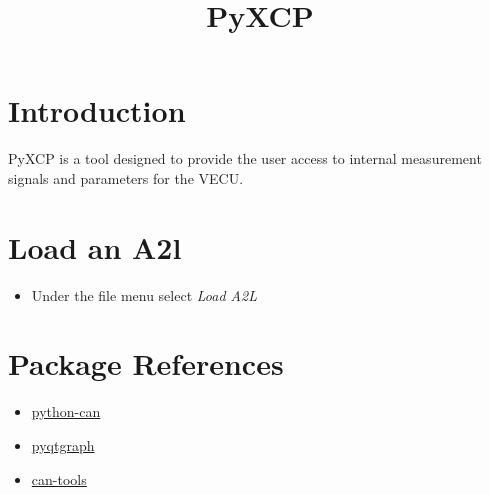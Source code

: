 \documentclass[11pt,article,oneside]{memoir}
\title{PyXCP}
\begin{document}
\maketitle


\section*{Introduction}
PyXCP is a tool designed to provide the user access to internal measurement signals and parameters for the VECU.

\section*{Load an A2l}
\begin{itemize}
	\item Under the file menu select \emph{Load A2L}
\end{itemize}

\section*{Package References}
\begin{itemize}
	\item \href{https://python-can.readthedocs.io/en/stable/}{python-can}
	\item \href{http://www.pyqtgraph.org/documentation/index.html}{pyqtgraph}
	\item \href{http://cantools.readthedocs.io/en/latest/}{can-tools}
\end{itemize}
\end{document}
